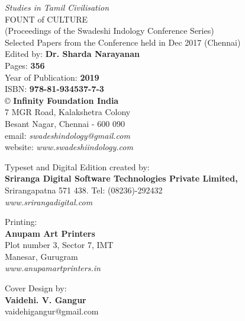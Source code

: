 \thispagestyle{empty}

 \textit{Studies in Tamil Civilisation}\\
 FOUNT of CULTURE\\ 
 (Proceedings of the Swadeshi Indology Conference Series)\\
 Selected Papers from the Conference held in Dec 2017 (Chennai)\\
 Edited by: \textbf{Dr. Sharda Narayanan}\\

 Pages: \textbf{356}\\
 Year of Publication: \textbf{2019}\\
 ISBN: \textbf{978-81-934537-7-3}\\

 © \textbf{Infinity Foundation India}\\
 7 MGR Road, Kalakshetra Colony\\
 Besant Nagar, Chennai - 600 090\\
 email: \textit{swadeshindology@gmail.com}\\
 website: \textit{www.swadeshiindology.com}

 Typeset and Digital Edition created by:\\\textbf{Sriranga Digital Software Technologies Private Limited,}\\
 Srirangapatna 571 438. Tel: (08236)-292432\\\textit{www.srirangadigital.com}

 Printing:\\\textbf{Anupam Art Printers}\\
 Plot number 3, Sector 7, IMT\\
 Manesar, Gurugram\\\textit{www.anupamartprinters.in}

 Cover Design by:\\\textbf{Vaidehi. V. Gangur}\\
 vaidehigangur@gmail.com

